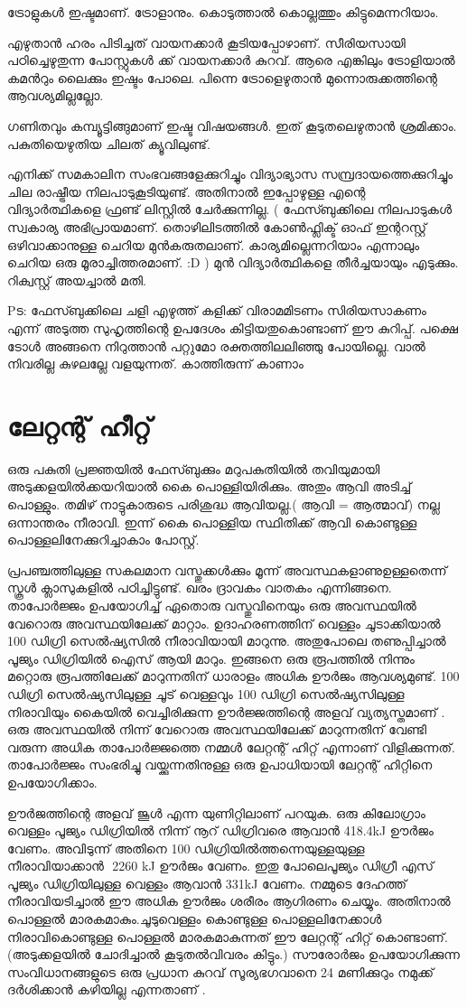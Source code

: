 \documentclass[10pt,a4paper]{report}
\begin{document}
ട്രോളുകൾ ഇഷ്ടമാണ്. ട്രോളാനും. കൊടുത്താൽ കൊല്ലത്തും കിട്ടുമെന്നറിയാം.

എഴുതാൻ ഹരം പിടിച്ചത് വായനക്കാർ കൂടിയപ്പോഴാണ്. സീരിയസായി പഠിച്ചെഴുതുന്ന പോസ്റ്റുകൾ ക്ക് വായനക്കാർ കുറവ്. ആരെ എങ്കിലും ട്രോളിയാൽ കമൻറും ലൈക്കും ഇഷ്ടം പോലെ. പിന്നെ ട്രോളെഴുതാൻ മുന്നൊരുക്കത്തിന്റെ ആവശ്യമില്ലല്ലോ.

ഗണിതവും കമ്പ്യൂട്ടിങ്ങുമാണ് ഇഷ്ട വിഷയങ്ങൾ. ഇത് കൂടുതലെഴുതാൻ ശ്രമിക്കാം. പകുതിയെഴുതിയ ചിലത് ക്യൂവിലുണ്ട്.

എനിക്ക് സമകാലിന സംഭവങ്ങളേക്കുറിച്ചും വിദ്യാഭ്യാസ സമ്പ്രദായത്തെക്കുറിച്ചും ചില രാഷ്ട്രീയ നിലപാടുകൂടിയുണ്ട്. അതിനാൽ ഇപ്പോഴുള്ള എന്റെ വിദ്യാർത്ഥികളെ ഫ്രണ്ട് ലിസ്റ്റിൽ ചേർക്കുന്നില്ല. ( ഫേസ്ബുക്കിലെ നിലപാടുകൾ സ്വകാര്യ അഭിപ്രായമാണ്‌. തൊഴിലിടത്തിൽ കോൺഫ്ലിക്ട് ഓഫ് ഇന്ററസ്റ്റ് ഒഴിവാക്കാനുള്ള ചെറിയ മുൻകരുതലാണ്. കാര്യമില്ലെന്നറിയാം എന്നാലും ചെറിയ ഒരു
മൂരാച്ചിത്തരമാണ്. :D ) മുൻ വിദ്യാർത്ഥികളെ തീർച്ചയായും എടുക്കും. റിക്വസ്റ്റ് അയച്ചാൽ മതി.

Pട: ഫേസ്ബുക്കിലെ ചളി എഴുത്ത് കളിക്ക് വിരാമമിടണം സിരിയസാകണം എന്ന് അടുത്ത സുഹൃത്തിന്റെ ഉപദേശം കിട്ടിയതുകൊണ്ടാണ് ഈ കുറിപ്പ്. പക്ഷെ ടോൾ അങ്ങനെ നിറുത്താൻ പറ്റുമോ രക്തത്തിലലിഞ്ഞു പോയില്ലെ. വാൽ നിവരില്ല കുഴലല്ലേ വളയുന്നത്. കാത്തിരുന്ന് കാണാം

\section{ലേറ്റന്റ് ഹീറ്റ് }
ഒരു പകുതി പ്രജ്ഞയിൽ ഫേസ്ബുക്കും മറുപകുതിയിൽ തവിയുമായി അടുക്കളയിൽക്കയറിയാൽ കൈ പൊള്ളിയിരിക്കും. അതും ആവി അടിച്ച് പൊള്ളും. തമിഴ് നാട്ടുകാരുടെ പരിശുദ്ധ ആവിയല്ല.( ആവി = ആത്മാവ്) നല്ല ഒന്നാന്തരം നീരാവി. ഇന്ന് കൈ പൊള്ളിയ സ്ഥിതിക്ക് ആവി കൊണ്ടുള്ള പൊള്ളലിനേക്കുറിച്ചാകാം പോസ്റ്റ്.

 പ്രപഞ്ചത്തിലുള്ള സകലമാന വസ്തുക്കൾക്കും മൂന്ന് അവസ്ഥകളാണുഉള്ളതെന്ന് സ്കൂൾ ക്ലാസുകളിൽ പഠിച്ചിട്ടുണ്ട്. ഖരം ദ്രാവകം വാതകം എന്നിങ്ങനെ. താപോർജ്ജം ഉപയോഗിച്ച് ഏതൊരു വസ്തുവിനെയും ഒരു അവസ്ഥയിൽ വേറൊരു അവസ്ഥയിലേക്ക് മാറ്റാം. ഉദാഹരണത്തിന് വെള്ളം ചൂടാക്കിയാൽ 100 ഡിഗ്രി സെൽഷ്യസിൽ നീരാവിയായി മാറുന്നു. അതുപോലെ തണുപ്പിച്ചാൽ പൂജ്യം ഡിഗ്രിയിൽ ഐസ് ആയി മാറും. ഇങ്ങനെ ഒരു രൂപത്തിൽ നിന്നും മറ്റൊരു രൂപത്തിലേക്ക് മാറുന്നതിന് ധാരാളം അധിക ഊർജം ആവശ്യമുണ്ട്. 100 ഡിഗ്രി സെൽഷ്യസിലുള്ള ചൂട് വെള്ളവും 100 ഡിഗ്രി സെൽഷ്യസിലുള്ള നിരാവിയും കൈയിൽ വെച്ചിരിക്കുന്ന ഊർജ്ജത്തിന്റെ അളവ് വ്യത്യസ്തമാണ് . ഒരു അവസ്ഥയിൽ നിന്ന് വേറൊരു അവസ്ഥയിലേക്ക് മാറുന്നതിന് വേണ്ടി വരുന്ന അധിക താപോർജ്ജത്തെ നമ്മൾ ലേറ്റന്റ് ഹിറ്റ് എന്നാണ് വിളിക്കുന്നത്. താപോർജ്ജം സംഭരിച്ചു വയ്ക്കുന്നതിനുള്ള ഒരു ഉപാധിയായി ലേറ്റന്റ് ഹിറ്റിനെ ഉപയോഗിക്കാം.
 
  ഊർജത്തിന്റെ അളവ് ജൂൾ എന്ന യുണിറ്റിലാണ് പറയുക. ഒരു കിലോഗ്രാം വെള്ളം പൂജ്യം ഡിഗ്രിയിൽ നിന്ന് നൂറ് ഡിഗ്രിവരെ ആവാന്‍ 418.4kJ ഊർജം വേണം. അവിടുന്ന് അതിനെ 100 ഡിഗ്രിയിൽത്തന്നെയുള്ളയുള്ള നീരാവിയാക്കാൻ ‍ 2260 kJ ഊർജം വേണം. ഇതു പോലെപൂജ്യം ഡിഗ്രീ എസ് പൂജ്യം ഡിഗ്രിയിലുള്ള വെള്ളം ആവാന്‍ 331kJ വേണം. നമ്മുടെ ദേഹത്ത് നീരാവിയടിച്ചാൽ ഈ അധിക ഊർജം ശരീരം ആഗിരണം ചെയ്യും. അതിനാൽ പൊള്ളൽ മാരകമാകും.ചൂടുവെള്ളം കൊണ്ടുള്ള പൊള്ളലിനേക്കാൾ നിരാവികൊണ്ടുള്ള പൊള്ളൽ മാരകമാകുന്നത് ഈ ലേറ്റന്റ് ഹിറ്റ് കൊണ്ടാണ്. (അടുക്കളയിൽ ചോദിച്ചാൽ കൂടുതൽവിവരം കിട്ടും.) സൗരോർജം ഉപയോഗിക്കുന്ന സംവിധാനങ്ങളുടെ ഒരു പ്രധാന കുറവ് സൂര്യഭഗവാനെ 24 മണിക്കുറും നമുക്ക് ദർശിക്കാൻ കഴിയില്ല എന്നതാണ് .
  
\end{document}
